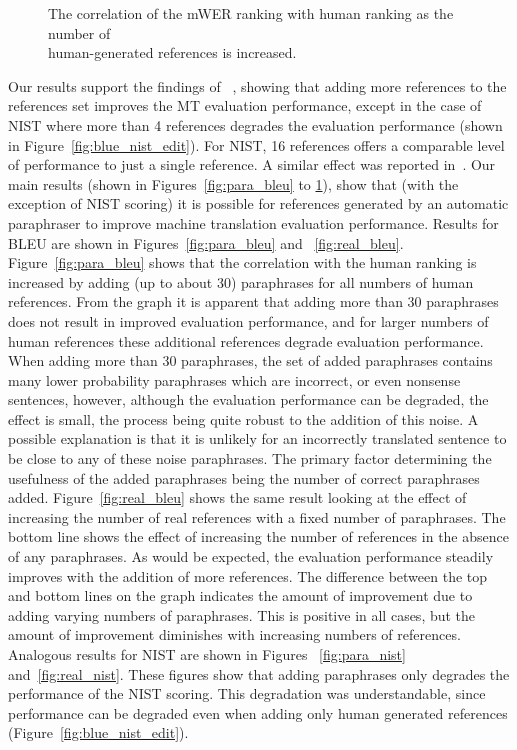 \begin{figure} 
\begin{center}
\textwidth
\mbox{}
\end{center}
\caption{
The correlation of the mWER ranking with human ranking as the number of \\
human-generated references is increased.
}
\label{fig:real_edit}
\end{figure}

Our results support the findings of ~\cite{Turian:03,Doddington:02}, showing that adding
more references to the references set improves the
MT evaluation performance, except in
the case of NIST where more than 4 references degrades
the evaluation performance (shown in Figure~\ref{fig:blue_nist_edit}). For NIST, 16
references offers a comparable level of performance
to just a single reference. A similar effect
was reported in~\cite{Doddington:02}.
Our main results (shown in Figures~\ref{fig:para_bleu} to \ref{fig:real_edit}),
show that (with the exception of NIST scoring) it
is possible for references generated by an automatic
paraphraser to improve machine translation
evaluation performance.
Results for BLEU are shown in Figures~\ref{fig:para_bleu} and
~\ref{fig:real_bleu}. Figure~\ref{fig:para_bleu} shows that the correlation with
the human ranking is increased by adding (up to about 30) paraphrases
for all numbers of human references. From
the graph it is apparent that adding more than 30
paraphrases does not result in improved evaluation
performance, and for larger numbers of human references
these additional references degrade evaluation
performance. When adding more than 30
paraphrases, the set of added paraphrases contains
many lower probability paraphrases which are incorrect,
or even nonsense sentences, however, although the
evaluation performance can be degraded, the effect
is small, the process being quite robust to the addition
of this noise. A possible explanation is that it
is unlikely for an incorrectly translated sentence to
be close to any of these noise paraphrases. The primary
factor determining the usefulness of the
added paraphrases being the number of correct
paraphrases added.
Figure~\ref{fig:real_bleu} shows the same result looking at the
effect of increasing the number of real references
with a fixed number of paraphrases. The bottom
line shows the effect of increasing the number of
references in the absence of any paraphrases. As
would be expected, the evaluation performance
steadily improves with the addition of more references.
The difference between the top and bottom
lines on the graph indicates the amount of improvement
due to adding varying numbers of paraphrases.
This is positive in all cases, but the
amount of improvement diminishes with increasing
numbers of references.
Analogous results for NIST are shown in Figures
~\ref{fig:para_nist} and~\ref{fig:real_nist}. These figures show that adding paraphrases
only degrades the performance of the
NIST scoring. This degradation was understandable,
since performance can be degraded even
when adding only human generated references
(Figure~\ref{fig:blue_nist_edit}).


